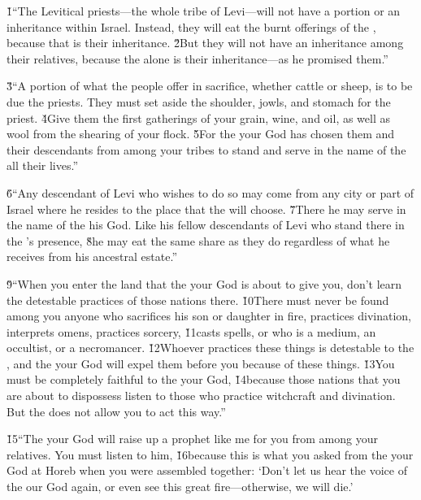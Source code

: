 \v{1}``The Levitical priests---the whole tribe of Levi---will not have a portion or an inheritance within Israel. Instead, they will eat the burnt offerings of the , because that is their inheritance. \v{2}But they will not have an inheritance among their relatives, because the  alone is their inheritance---as he promised them.''

\v{3}``A portion of what the people offer in sacrifice, whether cattle or sheep, is to be due the priests. They must set aside the shoulder, jowls, and stomach for the priest. \v{4}Give them the first gatherings of your grain, wine, and oil, as well as wool from the shearing of your flock. \v{5}For the  your God has chosen them and their descendants from among your tribes to stand and serve in the name of the  all their lives.''

\v{6}``Any descendant of Levi who wishes to do so may come from any city or part of Israel where he resides to the place that the  will choose. \v{7}There he may serve in the name of the  his God. Like his fellow descendants of Levi who stand there in the 's presence, \v{8}he may eat the same share as they do regardless of what he receives from his ancestral estate.''

\v{9}``When you enter the land that the  your God is about to give you, don't learn the detestable practices of those nations there. \v{10}There must never be found among you anyone who sacrifices his son or daughter in fire, practices divination, interprets omens, practices sorcery, \v{11}casts spells, or who is a medium, an occultist, or a necromancer. \v{12}Whoever practices these things is detestable to the , and the  your God will expel them before you because of these things. \v{13}You must be completely faithful to the  your God, \v{14}because those nations that you are about to dispossess listen to those who practice witchcraft and divination. But the  does not allow you to act this way.''

\v{15}``The  your God will raise up a prophet like me for you from among your relatives. You must listen to him, \v{16}because this is what you asked from the  your God at Horeb when you were assembled together: `Don't let us hear the voice of the  our God again, or even see this great fire---otherwise, we will die.'

